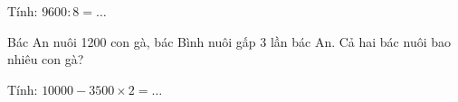\begin{ex}
Tính: $9600 : 8 = \dots$
\end{ex}

\begin{ex}
Bác An nuôi 1200 con gà, bác Bình nuôi gấp 3 lần bác An. Cả hai bác nuôi bao nhiêu con gà?
\end{ex}

\begin{ex}
Tính: $10000 - 3500 \times 2 = \dots$
\end{ex}
